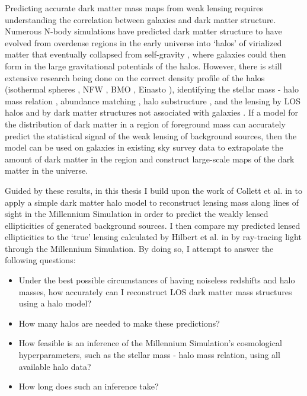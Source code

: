 \documentclass[%
 reprint,
 amsmath,amssymb,
 aps,nofootinbib
]{revtex4-1}
\begin{document}
Predicting accurate dark matter mass maps from weak lensing requires understanding the correlation between galaxies and dark matter structure. Numerous N-body simulations have predicted dark matter structure to have evolved from overdense regions in the early universe into `halos' of virialized matter that eventually collapsed from self-gravity \cite{halo_formation}, where galaxies could then form in the large gravitational potentials of the halos. However, there is still extensive research being done on the correct density profile of the halos (isothermal spheres \cite{isothermal_spheres}, NFW \cite{nfw}, BMO \cite{nfw_bmo}, Einasto \cite{einasto}), identifying the stellar mass - halo mass relation \cite{smhr}, abundance matching \cite{abundance_matching}, halo substructure \cite{halo_substructure}, and the lensing by LOS halos \cite{collett} and by dark matter structures not associated with galaxies \cite{mccully}. If a model for the distribution of dark matter in a region of foreground mass can accurately predict the statistical signal of the weak lensing of background sources, then the model can be used on galaxies in existing sky survey data to extrapolate the amount of dark matter in the region and construct large-scale maps of the dark matter in the universe.

Guided by these results, in this thesis I build upon the work of Collett et al. in \cite{collett} to apply a simple dark matter halo model to reconstruct lensing mass along lines of sight in the Millennium Simulation in order to predict the weakly lensed ellipticities of generated background sources. I then compare my predicted lensed ellipticities to the `true' lensing calculated by Hilbert et al. in \cite{ray_tracing} by ray-tracing light through the Millennium Simulation. By doing so, I attempt to answer the following questions: 

\begin{itemize}
\item Under the best possible circumstances of having noiseless redshifts and halo masses, how accurately can I reconstruct LOS dark matter mass structures using a halo model?
\item How many halos are needed to make these predictions?
\item How feasible is an inference of the Millennium Simulation's cosmological hyperparameters, such as the stellar mass - halo mass relation, using all available halo data? 
\item How long does such an inference take?
\end{itemize}
\end{document}
